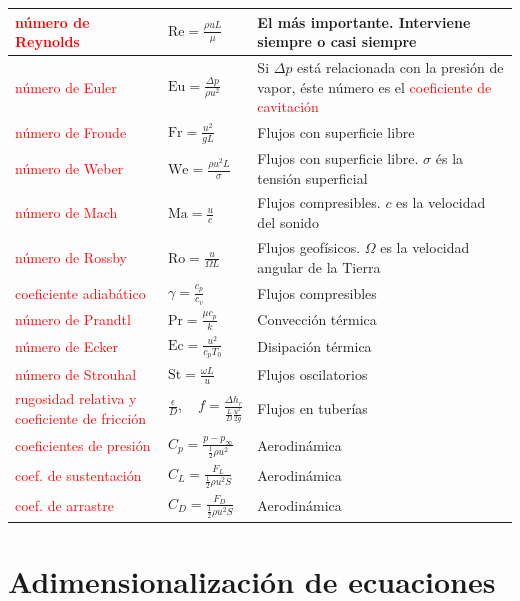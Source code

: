 \renewcommand{\arraystretch}{1.3}	
	\begin{tabular}{|>{\raggedright}p{}|>{\centering}p{}|>{\raggedright}p{}|}
		\hline 
		\textcolor{red}{número de Reynolds}{ } & {$\text{Re}=\frac{\rho uL}{\mu}$ } & {El más importante. Interviene siempre o casi siempre }\tabularnewline
		\hline 
		\textcolor{red}{número de Euler}{ } & {$\text{Eu}=\frac{\Delta p}{\rho u^{2}}$ } & {Si $\Delta p$ está relacionada con la presión de vapor, éste
			número es el }\textcolor{red}{coeficiente de cavitación}{ }\tabularnewline
		\hline 
		\textcolor{red}{número de Froude}{ } & {$\text{Fr}=\frac{u^{2}}{gL}$ } & {Flujos con superficie libre }\tabularnewline
		\hline 
		\textcolor{red}{número de Weber}{ } & {$\text{We}=\frac{\rho u^{2}L}{\sigma}$ } & {Flujos con superficie libre. $\sigma$ és la tensión superficial }\tabularnewline
		\hline 
		\textcolor{red}{número de Mach}{ } & {$\text{Ma}=\frac{u}{c}$ } & {Flujos compresibles. $c$ es la velocidad del sonido }\tabularnewline
		\hline 
		\textcolor{red}{número de Rossby}{ } & {$\text{Ro}=\frac{u}{\Omega L}$ } & {Flujos geof\'{i}sicos. $\Omega$ es la velocidad angular
			de la Tierra }\tabularnewline
		\hline 
		\textcolor{red}{coeficiente adiabático}{ } & {$\gamma=\frac{c_{p}}{c_{v}}$ } & { Flujos compresibles }\tabularnewline
		\hline 
		\textcolor{red}{número de Prandtl}{ } & {$\text{Pr}=\frac{\mu c_{p}}{k}$ } & { Convección térmica }\tabularnewline
		\hline 
		\textcolor{red}{número de Ecker}{ } & {$\text{Ec}=\frac{u^{2}}{c_{p}T_{0}}$ } & { Disipación térmica }\tabularnewline
		\hline 
		\textcolor{red}{número de Strouhal}{ } & {$\text{St}=\frac{\omega L}{u}$ } & { Flujos oscilatorios }\tabularnewline
		\hline 
		\textcolor{red}{rugosidad relativa y coeficiente de fricción}{ } & {$\frac{\epsilon}{D},\quad f=\frac{\Delta h_{r}}{\frac{L}{D}\frac{u^{2}}{2g}}$ } & { Flujos en tuber\'{i}as }\tabularnewline
		\hline 
		\textcolor{red}{coeficientes de presión} & {$C_{p}=\frac{p-p_{\infty}}{\frac{1}{2}\rho u^{2}}$ } & {Aerodinámica }\tabularnewline
		\hline 
		\textcolor{red}{coef. de sustentación}{ } & {$C_{L}=\frac{F_{L}}{\frac{1}{2}\rho u^{2}S}$ } & {Aerodinámica }\tabularnewline
		\hline 
		\textcolor{red}{coef. de arrastre}{ } & {$C_{D}=\frac{F_{D}}{\frac{1}{2}\rho u^{2}S}$ } & { Aerodinámica }\tabularnewline
		\hline 
	\end{tabular}
	\renewcommand{\arraystretch}{1}


\section{Adimensionalización de ecuaciones}

